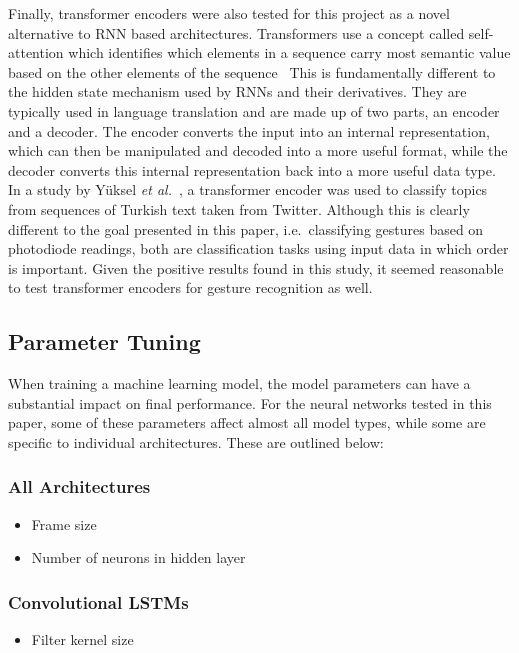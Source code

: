 Finally, transformer encoders were also tested for this project as a novel alternative to RNN based architectures.
Transformers use a concept called self-attention which identifies which elements in a sequence carry most semantic value based on the other elements of the sequence~\cite{https://doi.org/10.48550/arxiv.1706.03762}
This is fundamentally different to the hidden state mechanism used by RNNs and their derivatives.
They are typically used in language translation and are made up of two parts, an encoder and a decoder.
The encoder converts the input into an internal representation, which can then be manipulated and decoded into a more useful format, while the decoder converts this internal representation back into a more useful data type.
In a study by Y{\"u}ksel \textit{et al.}~\cite{yuksel-etal-2019-turkish}, a transformer encoder was used to classify topics from sequences of Turkish text taken from Twitter.
Although this is clearly different to the goal presented in this paper, i.e.\ classifying gestures based on photodiode readings, both are classification tasks using input data in which order is important.
Given the positive results found in this study, it seemed reasonable to test transformer encoders for gesture recognition as well.

\subsection{Parameter Tuning}\label{subsec:frame-size}
When training a machine learning model, the model parameters can have a substantial impact on final performance.
For the neural networks tested in this paper, some of these parameters affect almost all model types, while some are specific to individual architectures.
These are outlined below:

\subsubsection{All Architectures}
\begin{itemize}
    \item Frame size
    \item Number of neurons in hidden layer
\end{itemize}

\subsubsection{Convolutional LSTMs}
\begin{itemize}
    \item Filter kernel size
\end{itemize}

